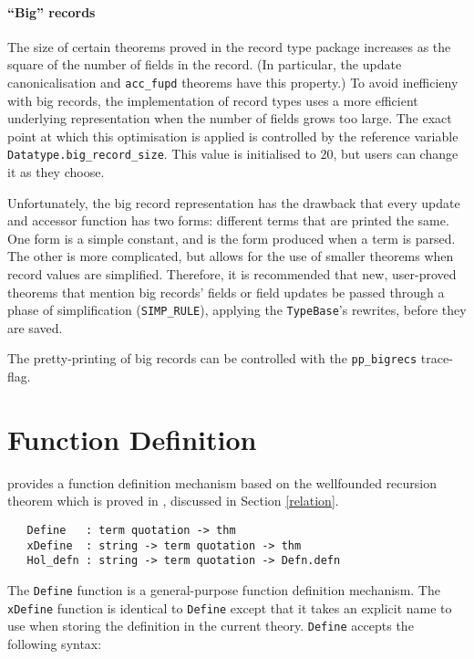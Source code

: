 \paragraph{``Big'' records} The size of certain theorems proved in the
record type package increases as the square of the number of fields in
the record.  (In particular, the update canonicalisation and
\texttt{acc\_fupd} theorems have this property.) To avoid inefficieny
with big records, the implementation of record types uses a more
efficient underlying representation when the number of fields grows
too large.  The exact point at which this optimisation is applied is
controlled by the reference variable
\texttt{Datatype.big\_record\_size}.  This value is initialised to 20,
but users can change it as they choose.

Unfortunately, the big record representation has the drawback that
every update and accessor function has two forms: different terms that
are printed the same.  One form is a simple constant, and is the form
produced when a term is parsed.  The other is more complicated, but
allows for the use of smaller theorems when record values are
simplified.  Therefore, it is recommended that new, user-proved
theorems that mention big records' fields or field updates be passed
through a phase of simplification (\texttt{SIMP\_RULE}), applying the
\texttt{TypeBase}'s rewrites, before they are saved.

The pretty-printing of big records can be controlled with the
\texttt{pp\_bigrecs} trace-flag.


\section{Function Definition}\label{TFL}

\HOL{} provides a function definition mechanism based on the
wellfounded recursion theorem which is proved in ,
discussed in Section \ref{relation}.

\begin{verbatim}
   Define   : term quotation -> thm
   xDefine  : string -> term quotation -> thm
   Hol_defn : string -> term quotation -> Defn.defn
\end{verbatim}

The \texttt{Define} function is a general-purpose function definition
mechanism. The \texttt{xDefine} function is identical to
{\small\verb+Define+} except that it takes an explicit name to use when
storing the definition in the current theory. {\small\tt Define}
accepts the following syntax:

